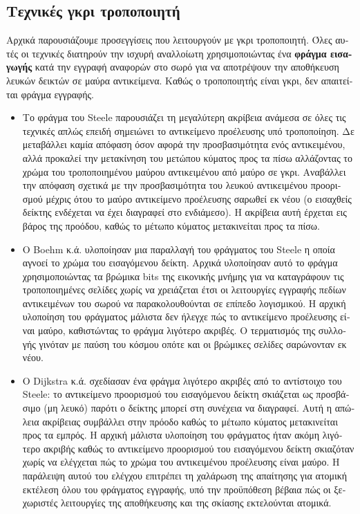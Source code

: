 \begin{greek}
\subsection{Τεχνικές γκρι τροποποιητή}
Αρχικά παρουσιάζουμε προσεγγίσεις που λειτουργούν με γκρι τροποποιητή.
Όλες αυτές οι τεχνικές διατηρούν την ισχυρή αναλλοίωτη χρησιμοποιώντας
ένα \textbf{φράγμα εισαγωγής} κατά την εγγραφή αναφορών στο σωρό για
να αποτρέψουν την αποθήκευση λευκών δεικτών σε μαύρα αντικείμενα.
Καθώς ο τροποποιητής είναι γκρι, δεν απαιτείται φράγμα εγγραφής.

\begin{itemize}
\item Το φράγμα του Steele \cite{DBLP:journals/cacm/Steele75} παρουσιάζει
τη μεγαλύτερη ακρίβεια ανάμεσα σε όλες τις τεχνικές απλώς επειδή
σημειώνει το αντικείμενο προέλευσης υπό τροποποίηση. Δε μεταβάλλει
καμία απόφαση όσον αφορά την προσβασιμότητα ενός αντικειμένου, αλλά
προκαλεί την μετακίνηση του μετώπου κύματος προς τα πίσω αλλάζοντας
το χρώμα του τροποποιημένου μαύρου αντικειμένου από μαύρο σε γκρι.
Αναβάλλει την απόφαση σχετικά με την προσβασιμότητα του λευκού
αντικειμένου προορισμού μέχρις ότου το μαύρο αντικείμενο προέλευσης
σαρωθεί εκ νέου (ο εισαχθείς δείκτης ενδέχεται να έχει διαγραφεί
στο ενδιάμεσο). Η ακρίβεια αυτή έρχεται εις βάρος της προόδου,
καθώς το μέτωπο κύματος μετακινείται προς τα πίσω.

\item Ο Boehm κ.ά. \cite{DBLP:conf/pldi/BoehmDS91} υλοποίησαν μια
παραλλαγή του φράγματος του Steele η οποία αγνοεί το χρώμα του
εισαγόμενου δείκτη. Αρχικά υλοποίησαν αυτό το φράγμα χρησιμοποιώντας
τα βρώμικα bits της εικονικής μνήμης για να καταγράφουν τις
τροποποιημένες σελίδες χωρίς να χρειάζεται έτσι οι λειτουργίες
εγγραφής πεδίων αντικειμένων του σωρού να παρακολουθούνται σε επίπεδο
λογισμικού. Η αρχική υλοποίηση του φράγματος μάλιστα δεν ήλεγχε
πώς το αντικείμενο προέλευσης είναι μαύρο, καθιστώντας το φράγμα
λιγότερο ακριβές. Ο τερματισμός της συλλογής γινόταν με παύση
του κόσμου οπότε και οι βρώμικες σελίδες σαρώνονταν εκ νέου.

\item Ο Dijkstra κ.ά. \cite{DBLP:conf/ac/DijkstraLMSS75,
DBLP:journals/cacm/DijkstraLMSS78} σχεδίασαν ένα φράγμα λιγότερο
ακριβές από το αντίστοιχο του Steele: το αντικείμενο προορισμού
του εισαγόμενου δείκτη σκιάζεται ως προσβάσιμο (μη λευκό) παρότι
ο δείκτης μπορεί στη συνέχεια να διαγραφεί. Αυτή η απώλεια
ακρίβειας συμβάλλει στην πρόοδο καθώς το μέτωπο κύματος
μετακινείται προς τα εμπρός. Η αρχική μάλιστα υλοποίηση του
φράγματος ήταν ακόμη λιγότερο ακριβής καθώς το αντικείμενο
προορισμού του εισαγόμενου δείκτη σκιαζόταν χωρίς να ελέγχεται
πώς το χρώμα του αντικειμένου προέλευσης είναι μαύρο. Η παράλειψη
αυτού του ελέγχου επιτρέπει τη χαλάρωση της απαίτησης για ατομική
εκτέλεση όλου του φράγματος εγγραφής, υπό την προϋπόθεση βέβαια
πώς οι ξεχωριστές λειτουργίες της αποθήκευσης και της σκίασης
εκτελούνται ατομικά.
\end{itemize}


\end{greek}

